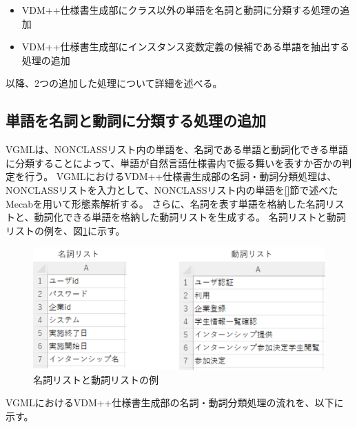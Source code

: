 \begin{itemize}
    \item VDM++仕様書生成部にクラス以外の単語を名詞と動詞に分類する処理の追加
    \item VDM++仕様書生成部にインスタンス変数定義の候補である単語を抽出する処理の追加
\end{itemize}

以降、2つの追加した処理について詳細を述べる。

\subsection{単語を名詞と動詞に分類する処理の追加}
\label{sec:classifier_meishi}
VGMLは、NONCLASSリスト内の単語を、名詞である単語と動詞化できる単語に分類することによって、単語が自然言語仕様書内で振る舞いを表すか否かの判定を行う。
VGMLにおけるVDM++仕様書生成部の名詞・動詞分類処理は、NONCLASSリストを入力として、NONCLASSリスト内の単語を\ref{}節で述べたMecabを用いて形態素解析する。
さらに、名詞を表す単語を格納した名詞リストと、動詞化できる単語を格納した動詞リストを生成する。
名詞リストと動詞リストの例を、図\ref{fig:meishi_doshi_list}に示す。

\begin{figure}[t]
    \begin{center}
        \includegraphics[width=500]{image/meishi_doshi_list.png}
        \caption{名詞リストと動詞リストの例}
        \label{fig:meishi_doshi_list}
    \end{center}
\end{figure}

VGMLにおけるVDM++仕様書生成部の名詞・動詞分類処理の流れを、以下に示す。


